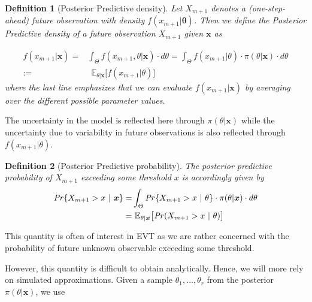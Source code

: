 \documentclass[11pt,a4paper,openany ]{book}
\newtheorem{definition}{Definition}[chapter]
\begin{document}
\begin{definition}[Posterior Predictive density]
	Let $X_{m+1}$ denotes a (one-step-ahead) future observation with density $f(x_{m+1}|\boldsymbol{\theta})$. Then we define the Posterior Predictive density of a future observation $X_{m+1}$ given $\boldsymbol{x}$ as 
	
	\begin{equation}
	\begin{aligned}
	f(x_{m+1}|\boldsymbol{x})
	= & \int_{\Theta}f(x_{m+1},\theta | \boldsymbol{x})\cdot d\theta=\int_{\Theta} f(x_{m+1}|\theta)\cdot \pi (\theta|\boldsymbol{x})\cdot d\theta
	\\ := & \ \ \mathbb{E}_{\theta|\boldsymbol{x}}\big[f(x_{m+1}|\theta)\big]
	\end{aligned}
	\end{equation}
	where the last line emphasizes that we can evaluate $f(x_{m+1}|\boldsymbol{x})$ by averaging over the different possible parameter values.
	
\end{definition}

The uncertainty in the model is reflected here through $\pi(\theta|\boldsymbol{x})$ while the uncertainty due to variability in future observations is also reflected through $f(x_{m+1}|\theta)$.

\begin{definition}[Posterior Predictive probability]
	The posterior predictive probability of $X_{m+1}$ exceeding some threshold $x$ is accordingly given by
	\begin{equation}
	\begin{aligned}
	\text{\emph{Pr}}\{X_{m+1}>x\ | \ \boldsymbol{x}\}= &\int_{\Theta}\text{\emph{Pr}}\{X_{m+1}>x \ | \ \theta \} \cdot \pi(\theta|\boldsymbol{x})\cdot d\theta \\ 
	= & \ \mathbb{E}_{\theta|\boldsymbol{x}}\big[\text{\emph{Pr}}(X_{m+1}>x \ | \ \theta)\big]
	\end{aligned}
	\end{equation}
\end{definition}

This quantity is often of interest in EVT as we are rather concerned with the probability of future unknown observable exceeding some threshold.

However, this quantity is difficult to obtain analytically. Hence, we will more rely on simulated approximations. Given a sample $\theta_1,\dots,\theta_r$ from the posterior $\pi(\theta|\boldsymbol{x})$, we use 
\end{document}
